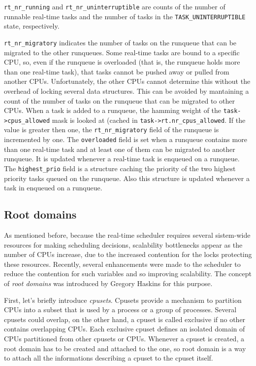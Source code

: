 \texttt{rt\_nr\_running} and \texttt{rt\_nr\_uninterruptible} are
counts of the number of runnable real-time tasks and the number of
tasks in the \texttt{TASK\_UNINTERRUPTIBLE} state,
respectively.

\texttt{rt\_nr\_migratory} indicates the number of tasks on the
runqueue that can be migrated to the other runqueues. Some real-time
tasks are bound to a specific CPU, so, even if the runqueue is
overloaded (that is, the runqueue holds more than one real-time task),
that tasks cannot be pushed away or pulled from another
CPUs. Unfortunately, the other CPUs cannot determine this without the
overhead of locking several data structures. This can be avoided by
mantaining a count of the number of tasks on the runqueue that can be
migrated to other CPUs. When a task is added to a runqueue, the
hamming weight of the \texttt{task->cpus\_allowed} mask is looked at
(cached in \texttt{task->rt.nr\_cpus\_allowed}.  If the value is
greater then one, the \texttt{rt\_nr\_migratory} field of the runqueue
is incremented by one. The \texttt{overloaded} field is set when a
runqueue contains more than one real-time task and at least one of
them can be migrated to another
runqueue. It is updated whenever a real-time task is enqueued on a runqueue.\\
The \texttt{highest\_prio} field is a structure caching the priority
of the two highest priority tasks queued on the runqueue. Also this
structure is updated whenever a task in enqueued on a runqueue.

\subsection{Root domains\label{sec:root_domains}}

As mentioned before, because the real-time scheduler requires several
sistem-wide resources for making scheduling decisions, scalability
bottlenecks appear as the number of CPUs increase, due to the
increased contention for the locks protecting these resources.
Recently, several enhancements were made to the scheduler to reduce
the contention for such variables and so improving scalability. The
concept of \emph{root domains} was introduced by
Gregory Haskins for this purpose.

First, let's briefly introduce \emph{cpusets}. Cpusets provide a
mechanism to partition CPUs into a subset that is used by a process or
a group of processes. Several cpusets could overlap, on the other
hand, a cpuset is called exclusive if no other contains overlapping
CPUs. Each exclusive cpuset defines an isolated domain of CPUs
partitioned from other cpusets or CPUs. Whenever a cpuset is created,
a root domain has to be created and attached to the one, so root
domain is a way to attach all the informations
describing a cpuset to the cpuset itself.

